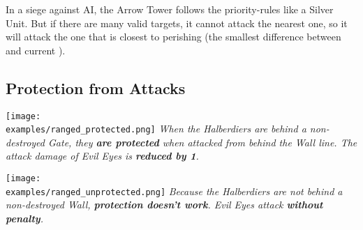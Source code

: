 \begin{multicols*}{2}
In a siege against AI, the Arrow Tower follows the priority-rules like a Silver  Unit. But if there are many valid targets, it cannot attack the nearest one, so it will attack the one that is closest to perishing (the smallest difference between  and current ).
\end{multicols*}

\newpage
\subsection*{Protection from  Attacks}
\begin{multicols}{2}
\vspace*{\fill}
\texttt{[image: \\examples/ranged\_protected.png]}
{\textit{When the Halberdiers are behind a non-destroyed Gate, they \textbf{are protected} when attacked from behind the Wall line.
  The  attack damage of Evil Eyes is \textbf{reduced by 1}.}}
\columnbreak

\vspace*{\fill}
\texttt{[image: \\examples/ranged\_unprotected.png]}
{\textit{Because the Halberdiers are not behind a non-destroyed Wall, \textbf{protection doesn't work}.
  Evil Eyes attack \textbf{without penalty}.}}
\newline\newline
\end{multicols}

